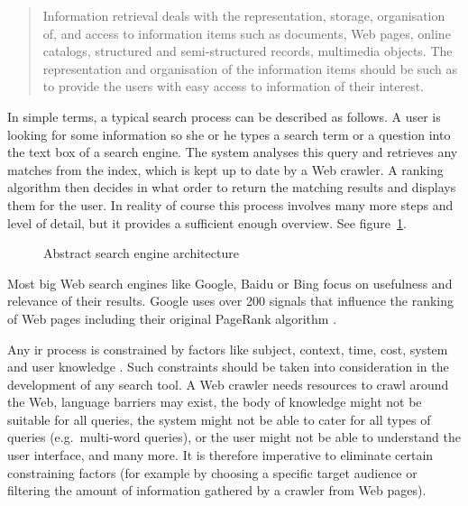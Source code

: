 \begin{quotation}
  Information retrieval deals with the representation, storage, organisation of, and access to information items such as documents, Web pages, online catalogs, structured and semi-structured records, multimedia objects. The representation and organisation of the information items should be such as to provide the users with easy access to information of their interest. 
\end{quotation}

In simple terms, a typical search process can be described as follows. A user is looking for some information so she or he types a search term or a question into the text box of a search engine. The system analyses this query and retrieves any matches from the index, which is kept up to date by a Web crawler. A ranking algorithm then decides in what order to return the matching results and displays them for the user. In reality of course this process involves many more steps and level of detail, but it provides a sufficient enough overview. See figure~\ref{fig:SEA}.

\begin{figure}[htbp]
  \centering
  
  \caption[Search Engine Architecture]{Abstract search engine architecture}
\label{fig:SEA}
\end{figure}

Most big Web search engines like Google, Baidu or Bing focus on usefulness and relevance of their results.\autocite{Google2012, Baidu2012, Microsoft2012a} Google uses over 200 signals \autocite{Google2012} that influence the ranking of Web pages including their original PageRank algorithm \autocite{Brin1998, Brin1998b}.

Any \gls{ir} process is constrained by factors like subject, context, time, cost, system and user knowledge \autocite{Marchionini1988}. Such constraints should be taken into consideration in the development of any search tool. A Web crawler needs resources to crawl around the Web, language barriers may exist, the body of knowledge might not be suitable for all queries, the system might not be able to cater for all types of queries (e.g.\ multi-word queries), or the user might not be able to understand the user interface, and many more. It is therefore imperative to eliminate certain constraining factors (for example by choosing a specific target audience or filtering the amount of information gathered by a crawler from Web pages).


